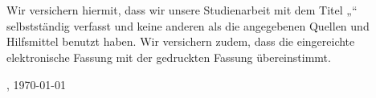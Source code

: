 
\thispagestyle{empty}
\newcommand\wildcard[2][7cm]{\vspace{2cm}\parbox{#1}{\hrulefill\par#2}}

\section*{}
\vspace*{2em}

Wir versichern hiermit, dass wir unsere Studienarbeit mit dem Titel „\thesisTitle“ selbstständig verfasst und keine anderen als die angegebenen Quellen und Hilfsmittel benutzt haben. Wir versichern zudem, dass die eingereichte elektronische Fassung mit der gedruckten Fassung übereinstimmt.

\vspace{3em}

\companyLocation, \today
\vspace{4em}

\begingroup
    \wildcard{\nameOne}
    \hspace*{\fill}
    \wildcard{\nameTwo}
    \par
\endgroup
